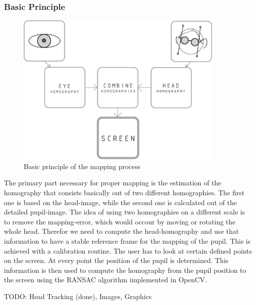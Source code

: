 \begin{itemize}
\subsubsection{Basic Principle}
\begin{figure}[H]
  \centering
  \includegraphics[width=0.9\textwidth]{../finalpres/01c.pdf}
  \caption{Basic principle of the mapping process}\label{fig:basic}
\end{figure}
The primary part necessary for proper mapping is the estimation of the homography that consists basically out of two different homographies. The first one is based on the head-image, while the second one is calculated out of the detailed pupil-image. 
The idea of using two homographies on a different scale is to remove the mapping-error, which would occour by moving or rotating the whole head. Therefor we need to compute the head-homography and use that information to have a stable reference frame for the mapping of the pupil. 
This is achieved with a calibration routine. The user has to look at certain defined points on the screen. 
At every point the position of the pupil is determined. 
This information is then used to compute the homography from the pupil position to the screen using the RANSAC algorithm implemented in OpenCV. 

TODO: Head Tracking (done), Images, Graphics


\end{itemize}
